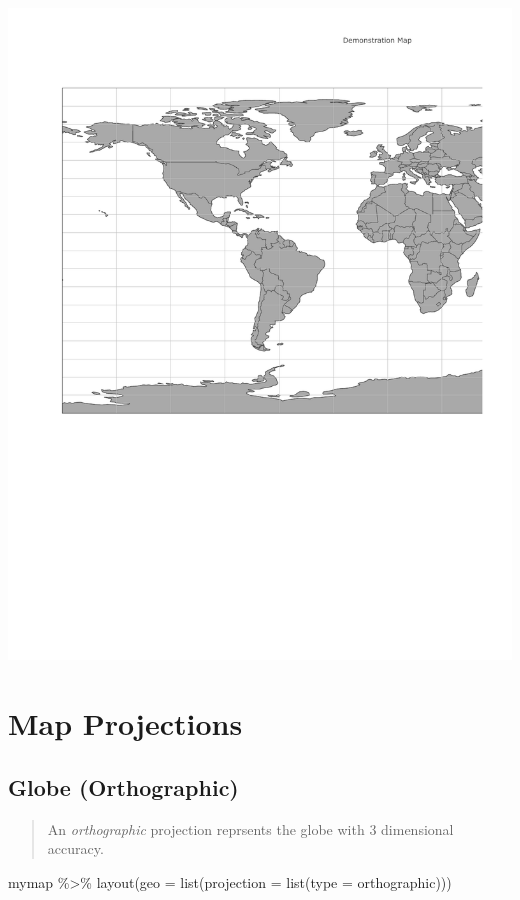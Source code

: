 \documentclass[
  letterpaper,
  DIV=11,
  numbers=noendperiod,
  oneside]{scrreprt}
\newenvironment{Shaded}{\begin{snugshade}}{\end{snugshade}}
\newcommand{\AttributeTok}[1]{\textcolor[rgb]{0.40,0.45,0.13}{#1}}
\newcommand{\FunctionTok}[1]{\textcolor[rgb]{0.28,0.35,0.67}{#1}}
\newcommand{\NormalTok}[1]{\textcolor[rgb]{0.00,0.23,0.31}{#1}}
\newcommand{\SpecialCharTok}[1]{\textcolor[rgb]{0.37,0.37,0.37}{#1}}
\newcommand{\StringTok}[1]{\textcolor[rgb]{0.13,0.47,0.30}{#1}}
\begin{document}
\includegraphics{projections_files/figure-pdf/unnamed-chunk-4-1.pdf}

\section{Map Projections}\label{map-projections}

\subsection{Globe (Orthographic)}\label{globe-orthographic}

\begin{quote}
An \emph{orthographic} projection reprsents the globe with 3 dimensional
accuracy.
\end{quote}

\begin{Shaded}
\begin{Highlighting}[]
\NormalTok{mymap }\SpecialCharTok{\%\textgreater{}\%} 
  \FunctionTok{layout}\NormalTok{(}\AttributeTok{geo =} \FunctionTok{list}\NormalTok{(}\AttributeTok{projection =} \FunctionTok{list}\NormalTok{(}\AttributeTok{type =} \StringTok{\textquotesingle{}orthographic\textquotesingle{}}\NormalTok{)))}
\end{Highlighting}
\end{Shaded}
\end{document}
